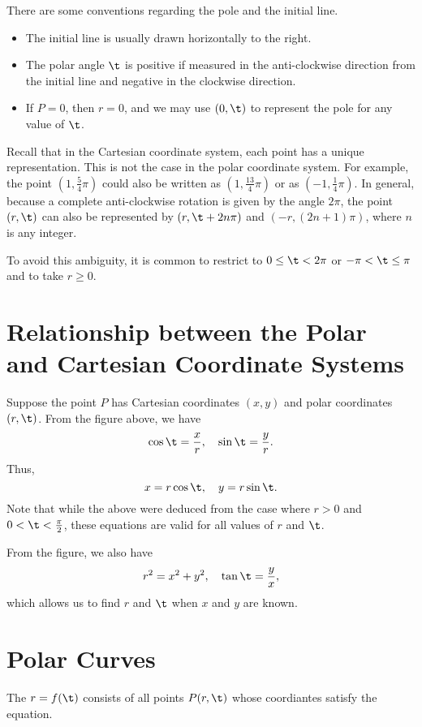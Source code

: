 There are some conventions regarding the pole and the initial line.
\begin{itemize}
    \item The initial line is usually drawn horizontally to the right.
    \item The polar angle $\t$ is positive if measured in the anti-clockwise direction from the initial line and negative in the clockwise direction.
    \item If $P = 0$, then $r = 0$, and we may use $(0, \t)$ to represent the pole for any value of $\t$.
\end{itemize}

Recall that in the Cartesian coordinate system, each point has a unique representation. This is not the case in the polar coordinate system. For example, the point $(1, \frac54 \pi)$ could also be written as $(1, \frac{13}{4} \pi)$ or as $(-1, \frac14 \pi)$. In general, because a complete anti-clockwise rotation is given by the angle $2\pi$, the point $(r, \t)$ can also be represented by $(r, \t + 2n\pi)$ and $(-r, (2n + 1)\pi)$, where $n$ is any integer.

To avoid this ambiguity, it is common to restrict to $0 \leq \t < 2\pi$ or $-\pi < \t \leq \pi$ and to take $r \geq 0$.

\section{Relationship between the Polar and Cartesian Coordinate Systems}

Suppose the point $P$ has Cartesian coordinates $(x, y)$ and polar coordinates $(r, \t)$. From the figure above, we have \[\cos \t = \frac{x}{r}, \quad \sin \t = \frac{y}{r}.\] Thus, \[x = r\cos \t, \quad y = r\sin\t.\] Note that while the above were deduced from the case where $r > 0$ and $0 < \t < \frac\pi2$, these equations are valid for all values of $r$ and $\t$.

From the figure, we also have \[r^2 = x^2 + y^2, \quad \tan \t = \frac{y}{x},\] which allows us to find $r$ and $\t$ when $x$ and $y$ are known.

\section{Polar Curves}

\begin{definition}
    The  $r = f(\t)$ consists of all points $P(r, \t)$ whose coordiantes satisfy the equation.
\end{definition}

